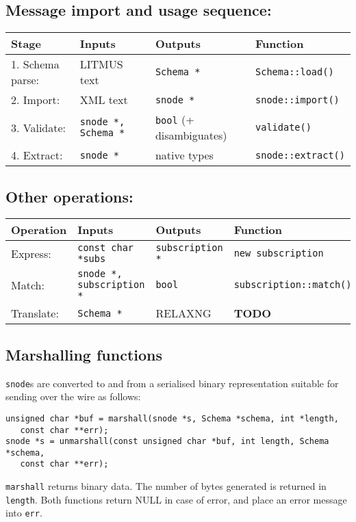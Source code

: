 \documentclass[12pt,a4paper,twoside]{article}
\renewcommand{\_}{\texttt{\symbol{95}}}
\begin{document}
\subsection*{Message import and usage sequence:}

\begin{tabular}{l|l|l|l}
Stage & Inputs & Outputs & Function\\
\hline
1. Schema parse: & LITMUS text & \verb^Schema *^ & \verb^Schema::load()^\\
2. Import:       & XML text & \verb^snode *^ & \verb^snode::import()^\\
3. Validate:     & \verb^snode *, Schema *^ & \verb^bool^
      (+ disambiguates) & \verb^validate()^\\
4. Extract:      & \verb^snode *^ & native types & \verb^snode::extract()^\\
\end{tabular}

\subsection*{Other operations:}

\begin{tabular}{l|l|l|l}
Operation & Inputs & Outputs & Function\\
\hline
Express: & \verb^const char *subs^ & \verb^subscription *^ &
\verb^new subscription^\\
Match: & \verb^snode *, subscription *^ & \verb^bool^ &
\verb^subscription::match()^\\
Translate: & \verb^Schema *^ & RELAXNG & \textbf{TODO}\\
\end{tabular}

\subsection*{Marshalling functions}

\verb^snode^s are converted to and from a serialised binary
representation suitable for sending over the wire as follows:

\begin{verbatim}
unsigned char *buf = marshall(snode *s, Schema *schema, int *length,
   const char **err);
snode *s = unmarshall(const unsigned char *buf, int length, Schema *schema,
   const char **err);
\end{verbatim}

\verb^marshall^ returns binary data. The number of bytes generated is
returned in \verb^length^. Both functions return NULL in case of error,
and place an error message into \verb^err^.
\end{document}
